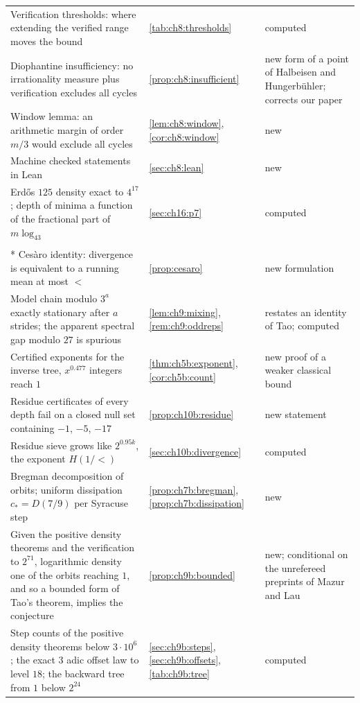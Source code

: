 {\begin{longtable}{@{}p{}>{\raggedright\arraybackslash}p{}>{\raggedright\arraybackslash}p{}@{}}
Verification thresholds: where extending the verified range moves the bound & \cref{tab:ch8:thresholds} & computed \\
Diophantine insufficiency: no irrationality measure plus verification excludes all cycles & \cref{prop:ch8:insufficient} & new form of a point of Halbeisen and Hungerb\"uhler; corrects our paper \\
Window lemma: an arithmetic margin of order $m/3$ would exclude all cycles & \cref{lem:ch8:window}, \cref{cor:ch8:window} & new \\
Machine checked statements in Lean & \cref{sec:ch8:lean} & new \\
Erd\H{o}s $125$ density exact to $4^{17}$; depth of minima a function of the fractional part of $m\log_43$ & \cref{sec:ch16:p7} & computed \\
\addlinespace[4pt]
\multicolumn{3}{@{}l}{\itshape Divergence, counting and residues}\\*
\addlinespace[2pt]
Ces\`aro identity: divergence is equivalent to a running mean at most $\lt$ & \cref{prop:cesaro} & new formulation \\
Model chain modulo $3^a$ exactly stationary after $a$ strides; the apparent spectral gap modulo $27$ is spurious & \cref{lem:ch9:mixing}, \cref{rem:ch9:oddreps} & restates an identity of Tao; computed \\
Certified exponents for the inverse tree, $x^{0.477}$ integers reach $1$ & \cref{thm:ch5b:exponent}, \cref{cor:ch5b:count} & new proof of a weaker classical bound \\
Residue certificates of every depth fail on a closed null set containing $-1$, $-5$, $-17$ & \cref{prop:ch10b:residue} & new statement \\
Residue sieve grows like $2^{0.95k}$, the exponent $H(1/\lt)$ & \cref{sec:ch10b:divergence} & computed \\
Bregman decomposition of orbits; uniform dissipation $c_*=D(7/9)$ per Syracuse step & \cref{prop:ch7b:bregman}, \cref{prop:ch7b:dissipation} & new \\
Given the positive density theorems and the verification to $2^{71}$, logarithmic density one of the orbits reaching $1$, and so a bounded form of Tao's theorem, implies the conjecture & \cref{prop:ch9b:bounded} & new; conditional on the unrefereed preprints of Mazur and Lau \\
Step counts of the positive density theorems below $3\cdot10^6$; the exact $3$ adic offset law to level $18$; the backward tree from $1$ below $2^{24}$ & \cref{sec:ch9b:steps}, \cref{sec:ch9b:offsets}, \cref{tab:ch9b:tree} & computed \\

\end{longtable}}
